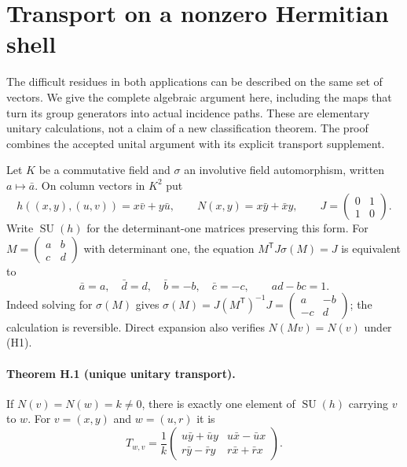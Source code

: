 \section{Transport on a nonzero Hermitian shell}

The difficult residues in both applications can be described on the
same set of vectors. We give the complete algebraic argument here,
including the maps that turn its group generators into actual incidence
paths. These are elementary unitary calculations, not a claim of a new
classification theorem. The proof combines the accepted unital argument
with its explicit transport supplement.

Let $K$ be a commutative field and $\sigma$ an involutive field
automorphism, written $a\mapsto\bar a$. On column vectors in $K^2$
put
\[
 h((x,y),(u,v))=x\bar v+y\bar u,
 \qquad N(x,y)=x\bar y+\bar x y,\qquad
 J=\begin{pmatrix}0&1\\1&0\end{pmatrix}.
\]
Write $\operatorname{SU}(h)$ for the determinant-one matrices
preserving this form. For $M=\left(\begin{smallmatrix}a&b\\c&d\end{smallmatrix}\right)$
with determinant one, the equation $M^{\mathsf T}J\sigma(M)=J$
is equivalent to
\[
 \bar a=a,\quad \bar d=d,\quad \bar b=-b,\quad \bar c=-c,
 \qquad ad-bc=1.                                             \tag{H1}
\]
Indeed solving for $\sigma(M)$ gives
$\sigma(M)=J(M^{\mathsf T})^{-1}J
=\left(\begin{smallmatrix}a&-b\\-c&d\end{smallmatrix}\right)$;
the calculation is reversible. Direct expansion also verifies
$N(Mv)=N(v)$ under (H1).

\paragraph{Theorem H.1 (unique unitary transport).}
If $N(v)=N(w)=k\ne0$, there is exactly one element of
$\operatorname{SU}(h)$ carrying $v$ to $w$. For $v=(x,y)$ and
$w=(u,r)$ it is
\[
 T_{w,v}=\frac1k
 \begin{pmatrix}
 u\bar y+\bar u y & u\bar x-\bar u x\\
 r\bar y-\bar r y & r\bar x+\bar r x
 \end{pmatrix}.                                              \tag{H2}
\]

